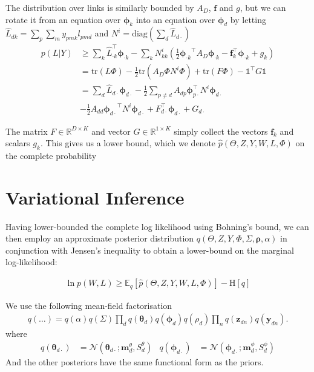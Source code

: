 \documentclass{sciposter}
\newcommand \ent[1] {
    \text{H} \left[ #1 \right]
}
\newcommand \ex[2] {
    \mathbb{E}_{ { #2 } }\left[ #1 \right]
}
\newcommand \halve[1] {
	\frac{#1}{2}
}
\newcommand \half {
    \halve{1}
}
\newcommand \tr { \text{tr} }
\newcommand \T { ^\top }
\newcommand \vv[1] { \bm #1 }
\newcommand \diag[1] { \text{diag} \left( {#1} \right) }
\newcommand \thd[0]  { { \vv \theta_d } }
\newcommand \Tr[1]   { \tr \left(  {#1}  \right) }
\newcommand \MReal[2] { { \mathbb{R}^{#1 \times #2} } }
\newcommand \one  {{  \mathds{1} }}
\newcommand \thdo { { \vv{\theta}_{d\cdot} } }
\newcommand \phok { { \vv{\phi}_{\cdot k} } }
\newcommand \phdo { { \vv{\phi}_{d\cdot} } }
\begin{document}
\begin{multicols}{3}
The distribution over links is similarly bounded by $A_D$, $\vv{f}$ and $g$, but we can rotate it from an equation over $\vv{\phi}_k$ into an equation over $\vv{\phi}_d$ by letting $\hat{L}_{dk} = \sum_p \sum_m y_{pmk} l_{pmd}$ and $N^i = \diag{\sum_d \hat{L}_{d\cdot}}$
\begin{equation*}
\begin{aligned}
p(L|Y) & \geq \sum_k \hat{L}_{\cdot k}\T \phok  - \sum_k N^i_{kk} \left(\half \phok\T A_D \phok - \vv{f}_k\T \phok + g_k\right) \\
& = \Tr{L \Phi} - \half \Tr{A_D \Phi N^i \Phi} + \Tr{F \Phi} - \one\T G \one \\
& = \sum_d \hat{L}_{d\cdot} \phdo - \half \sum_{p \neq d} A_{dp} \vv{\phi}_{p\cdot}\T N^i \phdo \\
&-\half A_{dd} \phdo\T N^i \phdo + F_{d\cdot}\T\phdo + G_{d\cdot}
\end{aligned}
\end{equation*}

The matrix $F \in \MReal{D}{K}$ and vector $G \in \MReal{1}{K}$ simply collect the vectors $\vv{f}_k$ and scalars $g_k$. This gives us a lower bound, which we denote $\hat{p}(\Theta, Z, Y, W, L, \Phi)$  on the complete probability

\section{Variational Inference}

\newcommand \mtd { { \vv{m}^{\theta}_d } }
\newcommand \std { { S^\theta_d } }
\newcommand \mpd { { \vv{m}^{\phi}_d } }
\newcommand \spd { { S^\phi_d } }

Having lower-bounded the complete log likelihood using Bohning's bound, we can then employ an approximate posterior distribution $q(\Theta, Z, Y, \Phi, \Sigma, \vv{\rho}, \alpha)$ in conjunction with Jensen's inequality to obtain a lower-bound on the marginal log-likelihood:

\begin{align*}
\ln p(W, L) \geq \ex{\hat{p}(\Theta, Z, Y, W, L, \Phi)}{q} - \ent{q}
\end{align*}

We use the following mean-field factorisation
\begin{align*}
q(\ldots) = q(\alpha)q(\Sigma)\prod_d q(\thd)q(\vv{\phi}_d)q(\rho_d)\prod_n q(\vv{z}_{dn})q(\vv{y}_{dn}).
\end{align*}
where 
\begin{align}
q(\thdo) &= \mathcal{N}\left(\thdo; \mtd, \std \right) &
q(\phdo) &= \mathcal{N}\left(\phdo; \mpd, \spd\right) 
\end{align}
And the other posteriors have the same functional form as the priors.\\


\end{multicols}
\end{document}
